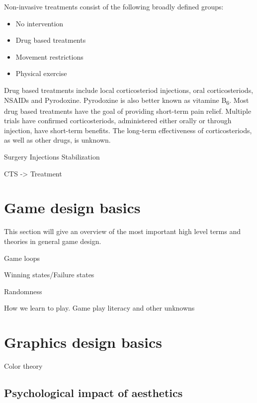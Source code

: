 Non-invasive treatments consist of the following broadly defined groups:
\begin{itemize}
	\item No intervention
	\item Drug based treatments
	\item Movement restrictions
	\item Physical exercise
\end{itemize}

Drug based treatments include local corticosteriod injections, oral corticosteriods, \gls{NSAIDs} and Pyrodoxine.
Pyrodoxine is also better known as vitamine B\textsubscript{6}.
Most drug based treatments have the goal of providing short-term pain relief.
Multiple trials have confirmed corticosteriods, administered either orally or through injection, have short-term benefits\cite{van2007repetitive}.
The long-term effectiveness of corticosteriods, as well as other drugs, is unknown.

Surgery
Injections
Stabilization

\gls{CTS} -> Treatment \cite{van2007repetitive}


\section{Game design basics}

This section will give an overview of the most important high level terms and theories in general game design.

Game loops

Winning states/Failure states

Randomness

How we learn to play. Game play literacy and other unknowns


\section{Graphics design basics}

Color theory

\subsection{Psychological impact of aesthetics}

